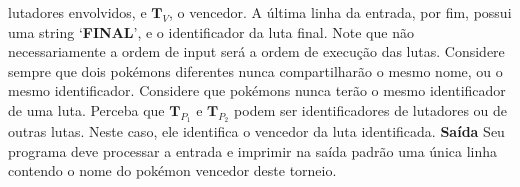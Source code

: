 \documentclass[a4paper, 12pt]{article}
\begin{document}
lutadores envolvidos, e $\textbf{T}_V$, o vencedor. \newline
A última linha da entrada, por fim, possui uma string `\textbf{FINAL}', e o identificador da
luta final. \newline Note que não necessariamente a ordem de input será a ordem de execução das
lutas. \newline \newline
Considere sempre que dois pokémons diferentes nunca compartilharão o mesmo
nome, ou o mesmo identificador. \newline
Considere que pokémons nunca terão o mesmo identificador de uma luta. \newline
Perceba que $\textbf{T}_{P_1}$ e $\textbf{T}_{P_2}$ podem ser identificadores de lutadores ou de outras lutas. \newline
Neste caso, ele identifica o vencedor da luta identificada. \newline \newline
\textbf{{\large Saída}} \newline
Seu programa deve processar a entrada e imprimir na saída padrão uma única
linha contendo o nome do pokémon vencedor deste torneio.
\newline
\end{document}

